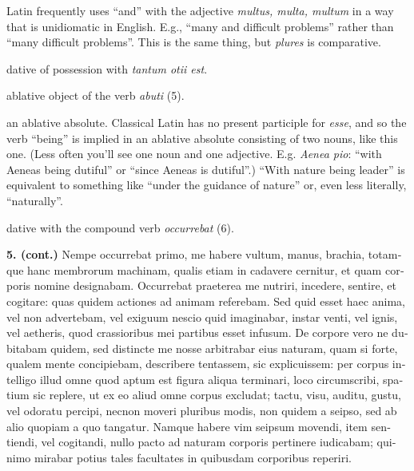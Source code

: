  Latin frequently uses ``and'' with the adjective \textit{multus, multa, multum} in a way that is unidiomatic in English. E.g., ``many and difficult problems'' rather than ``many difficult problems''. This is the same thing, but \textit{plures} is comparative.

 dative of possession with \textit{tantum otii est}.

 ablative object of the verb \textit{abuti} (5).

 an ablative absolute. Classical Latin has no present participle for \textit{esse}, and so the verb ``being'' is implied in an ablative absolute consisting of two nouns, like this one. (Less often you'll see one noun and one adjective. E.g. \textit{Aenea pio}: ``with Aeneas being dutiful'' or ``since Aeneas is dutiful''.) ``With nature being leader'' is equivalent to something like ``under the guidance of nature'' or, even less literally, ``naturally''.

 dative with the compound verb \textit{occurrebat} (6).

\clearpage

\beginnumbering
\pstart
{}
\begin{latin}
    \textenglish{\textbf{5. (cont.)}} Nempe occurrebat primo, me habere vultum, manus, brachia, totamque hanc membrorum machinam, qualis etiam in cadavere cernitur, et quam corporis nomine designabam. Occurrebat praeterea me nutriri, incedere, sentire, et cogitare: quas quidem actiones ad animam referebam. Sed quid esset haec anima, vel non advertebam, vel exiguum nescio quid imaginabar, instar venti, vel ignis, vel aetheris, quod crassioribus mei partibus esset infusum. De corpore vero ne dubitabam quidem, sed distincte me nosse arbitrabar eius naturam, quam si forte, qualem mente concipiebam, describere tentassem, sic explicuissem: per corpus intelligo illud omne quod aptum est figura aliqua terminari, loco circumscribi, spatium sic replere, ut ex eo aliud omne corpus excludat; tactu, visu, auditu, gustu, vel odoratu percipi, necnon moveri pluribus modis, non quidem a seipso, sed ab alio quopiam a quo tangatur. Namque habere vim seipsum movendi, item sentiendi, vel cogitandi, nullo pacto ad naturam corporis pertinere iudicabam; quinimo mirabar potius tales facultates in quibusdam corporibus reperiri.
\end{latin}
\pend
\endnumbering

